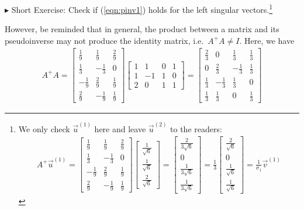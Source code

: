 $\blacktriangleright$ Short Exercise: Check if (\ref{eqn:pinv1}) holds for the left singular vectors.\footnote{We only check $\vec{u}^{(1)}$ here and leave $\vec{u}^{(2)}$ to the readers:
\begin{align*}
A^+\vec{u}^{(1)} = \begin{bmatrix}
\frac{1}{9}&\frac{1}{9}&\frac{2}{9}\\ 
\frac{1}{3}&-\frac{1}{3}&0\\ 
-\frac{1}{9}&\frac{2}{9}&\frac{1}{9}\\ 
\frac{2}{9}&-\frac{1}{9}&\frac{1}{9}
\end{bmatrix}
\begin{bmatrix}
\frac{1}{\sqrt{6}}\\ 
\frac{1}{\sqrt{6}}\\ 
\frac{2}{\sqrt{6}}    
\end{bmatrix}
=
\begin{bmatrix}
\frac{2}{3\sqrt{6}}\\ 
0\\ 
\frac{1}{3\sqrt{6}}\\ 
\frac{1}{3\sqrt{6}}
\end{bmatrix}
= \frac{1}{3}
\begin{bmatrix}
\frac{2}{\sqrt{6}}\\ 
0\\ 
\frac{1}{\sqrt{6}}\\ 
\frac{1}{\sqrt{6}}
\end{bmatrix}
= \frac{1}{\sigma_1}\vec{v}^{(1)}
\end{align*}}\par
However, be reminded that in general, the product between a matrix and its pseudoinverse may not produce the identity matrix, i.e.\ $A^+ A \neq I$. Here, we have
\begin{align*}
A^+ A = 
\begin{bmatrix}
\frac{1}{9}&\frac{1}{9}&\frac{2}{9}\\ 
\frac{1}{3}&-\frac{1}{3}&0\\ 
-\frac{1}{9}&\frac{2}{9}&\frac{1}{9}\\ 
\frac{2}{9}&-\frac{1}{9}&\frac{1}{9}
\end{bmatrix}  
\begin{bmatrix}
1&1&0&1\\ 
1&-1&1&0\\ 
2&0&1&1
\end{bmatrix}
=
\begin{bmatrix}
\frac{2}{3}&0&\frac{1}{3}&\frac{1}{3}\\ 
0&\frac{2}{3}&-\frac{1}{3}&\frac{1}{3}\\ 
\frac{1}{3}&-\frac{1}{3}&\frac{1}{3}&0\\ 
\frac{1}{3}&\frac{1}{3}&0&\frac{1}{3}
\end{bmatrix}
\end{align*}

